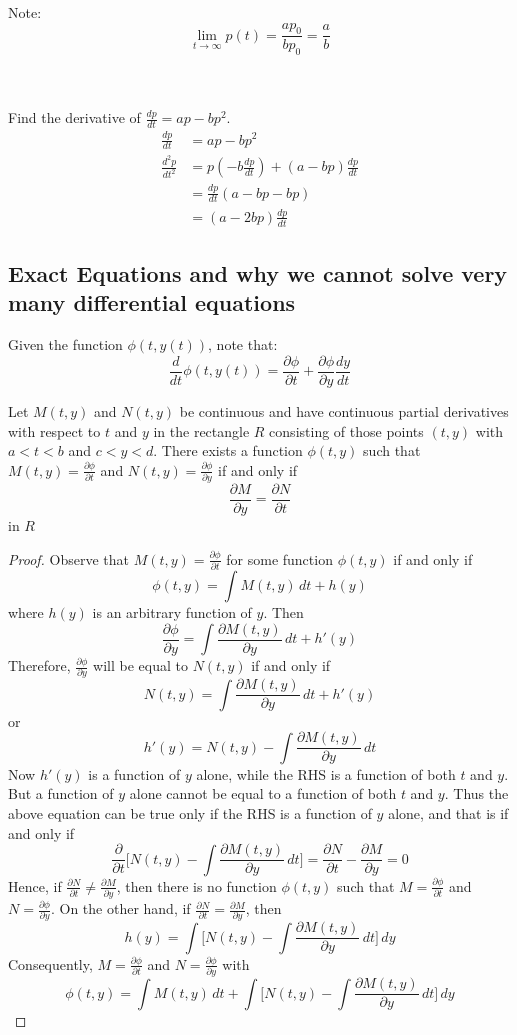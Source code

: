\documentclass[12pt]{article}
\begin{document}
Note: $$\lim_{t \to \infty} p(t) = \frac{ap_0}{bp_0} = \frac{a}{b} $$ \\~\\
\begin{example} Find the derivative of $\frac{dp}{dt} = ap - bp^2$. $$\begin{aligned} \frac{dp}{dt} &= ap - bp^2 \\ \frac{d^2p}{dt^2} &= p(-b\frac{dp}{dt}) + (a - bp)\frac{dp}{dt} \\ &= \frac{dp}{dt}(a - bp - bp) \\ &= (a - 2bp)\frac{dp}{dt} \end{aligned} $$ \end{example} 

\subsection{Exact Equations and why we cannot solve very many differential equations} 
Given the function $\phi(t, y(t))$, note that: $$ \frac{d}{dt} \phi(t, y(t)) = \frac{\partial \phi}{\partial t} + \frac{\partial \phi}{\partial y}\frac{dy}{dt} $$ 
\begin{theorem} Let $M(t, y)$ and $N(t, y)$ be continuous and have continuous partial derivatives with respect to $t$ and $y$ in the rectangle $R$ consisting of those points $(t, y)$ with $a < t < b$ and $c < y < d$. There exists a function $\phi(t, y)$ such that $M(t, y) = \frac{\partial \phi}{\partial t}$ and $N(t, y) = \frac{\partial \phi}{\partial y}$ if and only if $$\frac{\partial M}{\partial y} = \frac{\partial N}{\partial t} $$ in $R$\end{theorem} 
\begin{proof} Observe that $M(t, y) = \frac{\partial \phi}{\partial t}$ for some function $\phi(t, y)$ if and only if $$ \phi(t, y) = \int M(t, y) \, dt + h(y)$$ where $h(y)$ is an arbitrary function of $y$. Then $$\frac{\partial \phi}{\partial y} = \int \frac{\partial M(t, y)}{\partial y} \, dt + h'(y)$$ Therefore, $\frac{\partial \phi}{\partial y}$ will be equal to $N(t, y)$ if and only if $$N(t, y) = \int \frac{\partial M(t, y)}{\partial y} \, dt + h'(y)$$ or $$h'(y) = N(t, y) - \int \frac{\partial M(t, y)}{\partial y} \, dt $$ Now $h'(y)$ is a function of $y$ alone, while the RHS is a function of both $t$ and $y$. But a function of $y$ alone cannot be equal to a function of both $t$ and $y$. Thus the above equation can be true only if the RHS is a function of $y$ alone, and that is if and only if $$ \frac{\partial}{\partial t} \Big[ N(t, y) - \int \frac{\partial M(t, y)}{\partial y} \, dt \Big] = \frac{\partial N}{\partial t} - \frac{\partial M}{\partial y} = 0 $$ Hence, if $\frac{\partial N}{\partial t} \neq \frac{\partial M}{\partial y}$, then there is no function $\phi(t, y)$ such that $M = \frac{\partial \phi}{\partial t}$ and $N = \frac{\partial \phi}{\partial y}$. On the other hand, if $\frac{\partial N}{\partial t} = \frac{\partial M}{\partial y}$, then $$h(y) = \int\Big[N(t, y) - \int \frac{\partial M(t, y)}{\partial y}\, dt\Big]\, dy $$ Consequently, $M = \frac{\partial \phi}{\partial t}$ and $N = \frac{\partial \phi}{\partial y}$ with $$\phi(t, y) = \int M(t, y) \, dt + \int \Big[ N(t, y) - \int \frac{\partial M(t, y)}{\partial y}\, dt \Big] \, dy $$ \end{proof} 
\end{document}

